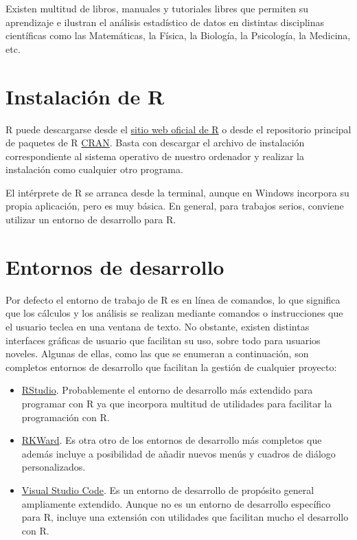 \documentclass[
  a4paper,
]{scrreport}
\theoremstyle{definition}
\theoremstyle{definition}
\theoremstyle{remark}
\begin{document}
Existen multitud de libros, manuales y tutoriales libres que permiten su
aprendizaje e ilustran el análisis estadístico de datos en distintas
disciplinas científicas como las Matemáticas, la Física, la Biología, la
Psicología, la Medicina, etc.

\hypertarget{instalaciuxf3n-de-r}{%
\section{Instalación de R}\label{instalaciuxf3n-de-r}}

R puede descargarse desde el \href{https://www.r-project.org/}{sitio web
oficial de R} o desde el repositorio principal de paquetes de R
\href{https://cran.r-project.org/}{CRAN}. Basta con descargar el archivo
de instalación correspondiente al sistema operativo de nuestro ordenador
y realizar la instalación como cualquier otro programa.

El intérprete de R se arranca desde la terminal, aunque en Windows
incorpora su propia aplicación, pero es muy básica. En general, para
trabajos serios, conviene utilizar un entorno de desarrollo para R.

\hypertarget{entornos-de-desarrollo}{%
\section{Entornos de desarrollo}\label{entornos-de-desarrollo}}

Por defecto el entorno de trabajo de R es en línea de comandos, lo que
significa que los cálculos y los análisis se realizan mediante comandos
o instrucciones que el usuario teclea en una ventana de texto. No
obstante, existen distintas interfaces gráficas de usuario que facilitan
su uso, sobre todo para usuarios noveles. Algunas de ellas, como las que
se enumeran a continuación, son completos entornos de desarrollo que
facilitan la gestión de cualquier proyecto:

\begin{itemize}
\item
  \href{https://www.rstudio.com/}{RStudio}. Probablemente el entorno de
  desarrollo más extendido para programar con R ya que incorpora
  multitud de utilidades para facilitar la programación con R.
\item
  \href{https://rkward.kde.org}{RKWard}. Es otra otro de los entornos de
  desarrollo más completos que además incluye a posibilidad de añadir
  nuevos menús y cuadros de diálogo personalizados.
\item
  \href{https://code.visualstudio.com/}{Visual Studio Code}. Es un
  entorno de desarrollo de propósito general ampliamente extendido.
  Aunque no es un entorno de desarrollo específico para R, incluye una
  extensión con utilidades que facilitan mucho el desarrollo con R.
\end{itemize}
\end{document}
